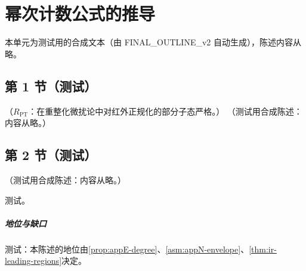 \chapter{幂次计数公式的推导}\label{app:appE}
本单元为测试用的合成文本（由 FINAL\_OUTLINE\_v2 自动生成），陈述内容从略。

\section{第 1 节（测试）}\label{sec:appE-units}

\begin{proposition}\label{prop:appE-degree}
（$R_{\mathrm{PT}}$：在重整化微扰论中对红外正规化的部分子态严格。）
（测试用合成陈述：内容从略。）
\end{proposition}

\section{第 2 节（测试）}\label{sec:appE-formula}

\begin{remark}\label{rem:appE-actual-bound}
（测试用合成陈述：内容从略。）
\end{remark}
\begin{proofsketch}测试。\end{proofsketch}
\paragraph{地位与缺口}测试：本陈述的地位由\cref{prop:appE-degree}、\cref{asm:appN-envelope}、\cref{thm:ir-leading-regions}决定。
